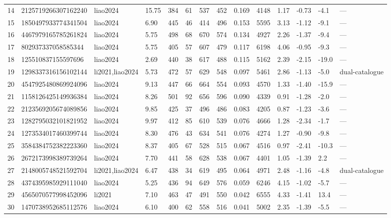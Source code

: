 \begin{table}
\begin{tabular}{llllllllllllll}
14 & 2125719266307162240 & liao2024 & 15.75 & 384 & 61 & 537 & 452 & 0.169 & 4148 & 1.17 & -0.73 & -4.1 & --- \\
15 & 1850497933774341504 & liao2024 & 6.90 & 445 & 46 & 414 & 496 & 0.153 & 5595 & 3.13 & -1.12 & -9.1 & --- \\
16 & 4467979165785261824 & liao2024 & 5.75 & 498 & 68 & 670 & 574 & 0.134 & 4927 & 2.26 & -1.37 & -9.4 & --- \\
17 & 802937337058585344 & liao2024 & 5.75 & 405 & 57 & 607 & 479 & 0.117 & 6198 & 4.06 & -0.95 & -9.3 & --- \\
18 & 125510837155597696 & liao2024 & 2.69 & 440 & 38 & 617 & 488 & 0.115 & 5162 & 2.39 & -2.15 & -19.0 & --- \\
19 & 1298337316156102144 & li2021,liao2024 & 5.73 & 472 & 57 & 629 & 548 & 0.097 & 5461 & 2.86 & -1.13 & -5.0 & dual-catalogue \\
20 & 4547925480869924096 & liao2024 & 9.13 & 447 & 66 & 664 & 554 & 0.093 & 4570 & 1.33 & -1.40 & -15.9 & --- \\
21 & 1158126425149936384 & liao2024 & 8.26 & 501 & 92 & 656 & 596 & 0.090 & 4339 & 0.91 & -1.28 & -2.0 & --- \\
22 & 2123569205674089856 & liao2024 & 9.85 & 425 & 37 & 496 & 486 & 0.083 & 4205 & 0.87 & -1.23 & -3.6 & --- \\
23 & 1282795032101821952 & liao2024 & 9.97 & 412 & 85 & 610 & 539 & 0.076 & 4666 & 1.28 & -2.34 & -1.7 & --- \\
24 & 1273534017460399744 & liao2024 & 8.30 & 476 & 43 & 634 & 541 & 0.076 & 4274 & 1.27 & -0.90 & -9.8 & --- \\
25 & 3584384752382223360 & liao2024 & 8.37 & 405 & 67 & 528 & 515 & 0.067 & 4516 & 0.97 & -2.41 & -10.3 & --- \\
26 & 2672173998389739264 & liao2024 & 7.70 & 441 & 58 & 628 & 538 & 0.067 & 4401 & 1.05 & -1.39 & 2.2 & --- \\
27 & 2148005748521592704 & li2021,liao2024 & 6.47 & 438 & 34 & 619 & 495 & 0.064 & 4971 & 2.48 & -1.16 & -4.8 & dual-catalogue \\
28 & 4374395985929111040 & liao2024 & 5.25 & 436 & 94 & 649 & 576 & 0.059 & 6246 & 4.15 & -1.02 & -5.7 & --- \\
29 & 4565070577998452096 & li2021 & 7.10 & 463 & 47 & 491 & 550 & 0.042 & 6555 & 4.33 & -1.41 & 13.4 & --- \\
30 & 1470738952685112576 & liao2024 & 6.10 & 400 & 62 & 558 & 516 & 0.041 & 5002 & 2.35 & -1.39 & -5.5 & --- \\
\bottomrule
\end{tabular}
\end{table}
